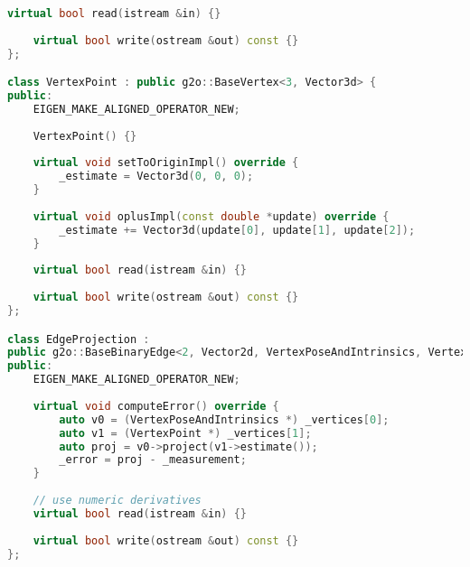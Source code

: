 \begin{lstlisting}[language=c++,caption=slambook2/ch9/bundle_adjustment_g2o.cpp（片段）]
	virtual bool read(istream &in) {}
	
	virtual bool write(ostream &out) const {}
};

class VertexPoint : public g2o::BaseVertex<3, Vector3d> {
public:
	EIGEN_MAKE_ALIGNED_OPERATOR_NEW;
	
	VertexPoint() {}
	
	virtual void setToOriginImpl() override {
		_estimate = Vector3d(0, 0, 0);
	}
	
	virtual void oplusImpl(const double *update) override {
		_estimate += Vector3d(update[0], update[1], update[2]);
	}
	
	virtual bool read(istream &in) {}
	
	virtual bool write(ostream &out) const {}
};

class EdgeProjection :
public g2o::BaseBinaryEdge<2, Vector2d, VertexPoseAndIntrinsics, VertexPoint> {
public:
	EIGEN_MAKE_ALIGNED_OPERATOR_NEW;
	
	virtual void computeError() override {
		auto v0 = (VertexPoseAndIntrinsics *) _vertices[0];
		auto v1 = (VertexPoint *) _vertices[1];
		auto proj = v0->project(v1->estimate());
		_error = proj - _measurement;
	}
	
	// use numeric derivatives
	virtual bool read(istream &in) {}
	
	virtual bool write(ostream &out) const {}
};
\end{lstlisting}

